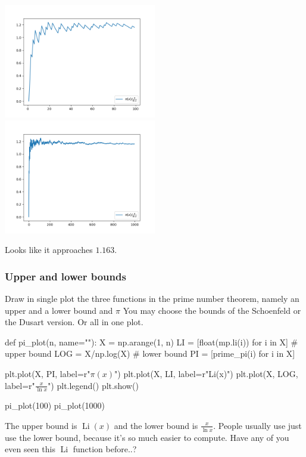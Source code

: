 \documentclass{article}
\begin{document}
  \noindent
  \includegraphics[width=0.5\textwidth]{div100}%
  \includegraphics[width=0.5\textwidth]{div1000}

  Looks like it approaches $1.163$.

  \subsubsection{Upper and lower bounds}
  \begin{centerframebox}
    Draw in single plot the three functions in the prime number theorem,
    namely an upper and a lower bound and $\pi$ You may choose the
    bounds of the Schoenfeld or the Dusart version. Or all in one plot.
  \end{centerframebox}
  \begin{mylisting}
    def pi_plot(n, name=""):
      X = np.arange(1, n)
      LI = [float(mp.li(i)) for i in X] # upper bound
      LOG = X/np.log(X) # lower bound
      PI = [prime_pi(i) for i in X]

      plt.plot(X, PI, label=r"$\pi(x)$")
      plt.plot(X, LI, label=r"Li(x)")
      plt.plot(X, LOG, label=r"$\frac{x}{\ln x}$")
      plt.legend()
      plt.show()

    pi_plot(100)
    pi_plot(1000)
  \end{mylisting}
  The upper bound is $\operatorname{Li}(x)$ and the lower bound is $\frac{x}{\ln x}$.
  People usually use just use the lower bound, because it's so much easier to compute.
  Have any of you even seen this $\operatorname{Li}$ function before..?
\end{document}
